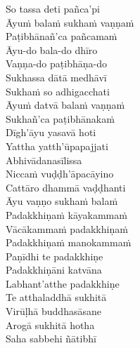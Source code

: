 \begin{verses}
  So tassa deti pañca'pi\\
  Āyuṁ balaṁ sukhaṁ vaṇṇaṁ\\
  Paṭibhānañ'ca pañcamaṁ\makeatletter\hyperlink{endnote122-appendix}\makeatother\\
  Āyu-do bala-do dhīro\\
  Vaṇṇa-do paṭibhāṇa-do\\
  Sukhassa dātā medhāvī\\
  Sukhaṁ so adhigacchati\\
  Āyuṁ datvā balaṁ vaṇṇaṁ\\
  Sukhañ'ca paṭibhānakaṁ\makeatletter\hyperlink{endnote123-appendix}\makeatother\\
  Dīgh'āyu yasavā hoti\\
  Yattha yatth'ūpapajjati\\
  Abhivādanasīlissa\\
  Niccaṁ vuḍḍh'āpacāyino\\
  Cattāro dhammā vaḍḍhanti\\
  Āyu vaṇṇo sukhaṁ balaṁ\\
  Padakkhiṇaṁ kāyakammaṁ\\
  Vācākammaṁ padakkhiṇaṁ\\
  Padakkhiṇaṁ manokammaṁ\\
  Paṇīdhi te padakkhiṇe\\
  Padakkhiṇāni katvāna\\
  Labhant'atthe padakkhiṇe\\
  Te atthaladdhā sukhitā\\
  Virūḷhā buddhasāsane\\
  Arogā sukhitā hotha\\
  Saha sabbehi ñātibhī
\end{verses}

